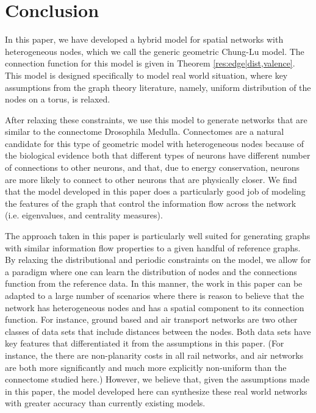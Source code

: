 \documentclass[11]{article}
\theoremstyle{remark}
\theoremstyle{definition}
\begin{document}
\section{Conclusion}

In this paper, we have developed a hybrid model for spatial networks with heterogeneous nodes, which we call the generic geometric Chung-Lu model. The connection function for this model is given in Theorem \ref{res:edge|dist,valence}. This model is designed specifically to model real world situation, where key  assumptions from the graph theory literature, namely, uniform distribution of the nodes on a torus, is relaxed.

After relaxing these constraints, we use this model to generate networks that are similar to the connectome Drosophila Medulla. Connectomes are a natural candidate for this type of geometric model with heterogeneous nodes because of the biological evidence both that different types of neurons have different number of connections to other neurons, and that, due to energy conservation, neurons are more likely to connect to other neurons that are physically closer.  We find that the model developed in this paper does a particularly good job of modeling the features of the graph that control the information flow across the network (i.e. eigenvalues, and centrality measures). 

The approach taken in this paper is particularly well suited for generating graphs with similar information flow properties to a given handful of reference graphs. By relaxing the distributional and periodic constraints on the model, we allow for a paradigm where one can learn the distribution of nodes and the connections function from the reference data. In this manner, the work in this paper can be adapted to a large number of scenarios where there is reason to believe that the network has heterogeneous nodes and has a spatial component to its connection function. For instance, ground based and air transport networks are two other classes of data sets that include distances between the nodes. Both data sets have key features that differentiated it from the assumptions in this paper. (For instance, the there are non-planarity costs in all rail networks, and air networks are both more significantly and much more explicitly non-uniform than the connectome studied here.) However, we believe that, given the assumptions made in this paper, the model developed here can synthesize these real world networks with greater accuracy than currently existing models. 
\end{document}
